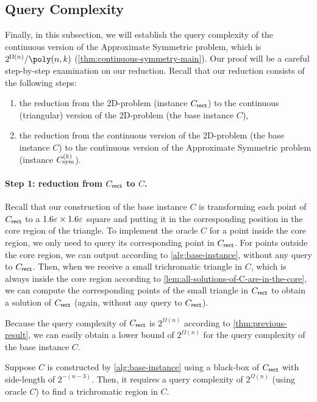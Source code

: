 \subsection{Query Complexity}
\label{subsec:query-complexity}
Finally, in this subsection, we will establish the query complexity of the continuous version of the \outofk Approximate Symmetric \Sperner problem, which is $2^{\Omega(n)}/\poly(n,k)$ (\cref{thm:continuous-symmetry-main}). 
Our proof will be a careful step-by-step examination on our reduction.
Recall that our reduction consists of the following steps:
\begin{enumerate}[itemsep=0.2em,topsep=0.5em]
    \item the reduction from the 2{\rm D}-\rect\Sperner problem (instance $C_{{\sf rect}}$) to the continuous (triangular) version of the 2{\rm D}-\Sperner problem (the base instance $C$), 
    \item the reduction from the continuous version of the 2{\rm D}-\Sperner problem (the base instance $C$) to the continuous version of the \outofk Approximate Symmetric \Sperner problem (instance $C_{\rm sym}^{(k)}$).
\end{enumerate}

\paragraph{Step 1: reduction from $C_{{\sf rect}}$ to $C$.}
Recall that our construction of the base instance $C$ is transforming each point of $C_{{\sf rect}}$ to a $1.6\varepsilon\times 1.6\varepsilon$ square and putting it in the corresponding position in the core region of the triangle. To implement the oracle $C$ for a point inside the core region, we only need to query its corresponding point in $C_{{\sf rect}}$. For points outside the core region, we can output according to \cref{alg:base-instance}, without any query to $C_{{\sf rect}}$. 
Then, when we receive a small trichromatic triangle in $C$, which is always inside the core region according to \cref{lem:all-solutions-of-C-are-in-the-core}, we can compute the corresponding points of the small triangle in $C_{{\sf rect}}$ to obtain a solution of $C_{{\sf rect}}$ (again, without any query to $C_{{\sf rect}}$). 

Because the query complexity of $C_{{\sf rect}}$ is $2^{\Omega(n)}$ according to \cref{thm:previous-result},
we can easily obtain a lower bound of $2^{\Omega(n)}$ for the query complexity of the base instance $C$.
\begin{lemma}
    \label{lem:query-complexity-of-2D}
    Suppose $C$ is constructed by \cref{alg:base-instance} using a black-box of $C_{{\sf rect}}$ with side-length of $2^{-(n-3)}$.
    Then, it requires a query complexity of $2^{\Omega(n)}$ (using oracle $C$) to find a trichromatic region in $C$. 
\end{lemma}

